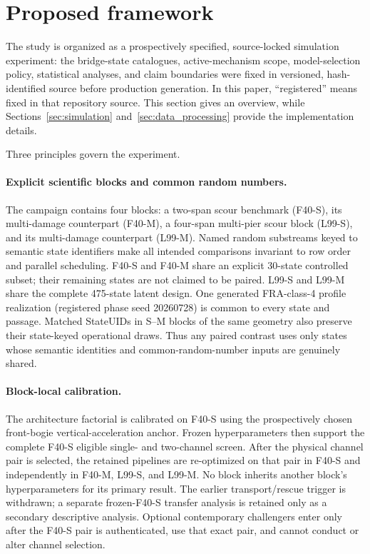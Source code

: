 \section{Proposed framework}
\label{sec:framework}

The study is organized as a prospectively specified, source-locked simulation
experiment: the bridge-state catalogues, active-mechanism scope, model-selection
policy, statistical analyses, and claim boundaries were fixed in versioned,
hash-identified source before production generation. In this paper,
``registered'' means fixed in that repository source. This section gives an overview, while
Sections~\ref{sec:simulation} and~\ref{sec:data_processing} provide the
implementation details.

Three principles govern the experiment.

\paragraph{Explicit scientific blocks and common random numbers.}
The campaign contains four blocks: a two-span scour benchmark (F40-S), its
multi-damage counterpart (F40-M), a four-span multi-pier scour block (L99-S),
and its multi-damage counterpart (L99-M). Named random substreams keyed to
semantic state identifiers make all intended comparisons invariant to row
order and parallel scheduling. F40-S and F40-M share an explicit 30-state
controlled subset; their remaining states are not claimed to be paired.
L99-S and L99-M share the complete 475-state latent design. One generated
FRA-class-4 profile realization (registered phase seed 20260728) is common to
every state and passage. Matched StateUIDs in S--M blocks of the same geometry
also preserve their state-keyed operational draws. Thus any paired contrast
uses only states whose semantic identities and common-random-number inputs are
genuinely shared.

\paragraph{Block-local calibration.}
The architecture factorial is calibrated on F40-S using the prospectively
chosen front-bogie vertical-acceleration anchor. Frozen hyperparameters then
support the complete F40-S eligible single- and two-channel screen. After the physical
channel pair is selected, the retained pipelines are re-optimized on that pair
in F40-S and independently in F40-M, L99-S, and L99-M. No block inherits
another block's hyperparameters for its primary result. The earlier
transport/rescue trigger is withdrawn; a separate frozen-F40-S transfer
analysis is retained only as a secondary descriptive analysis. Optional
contemporary challengers enter only after the F40-S pair is authenticated, use
that exact pair, and cannot conduct or alter channel selection.


